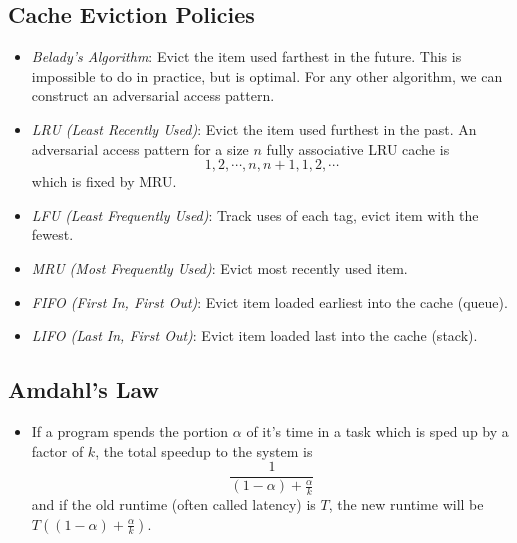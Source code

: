 \documentclass[12pt]{article}
\begin{document}
\subsection{Cache Eviction Policies}
\begin{itemize}
	\item \textit{Belady's Algorithm}: Evict the item used farthest in the future. This is impossible to do in practice, but is optimal. For any other algorithm, we can construct an adversarial access pattern. 
	\item \textit{LRU (Least Recently Used)}: Evict the item used furthest in the past. An adversarial access pattern for a size $n$ fully associative LRU cache is
		\begin{equation*}
			1,2,\cdots,n,n+1,1,2,\cdots
		\end{equation*}
		which is fixed by MRU.
	\item \textit{LFU (Least Frequently Used)}: Track uses of each tag, evict item with the fewest. 
	\item \textit{MRU (Most Frequently Used)}: Evict most recently used item. 
	\item \textit{FIFO (First In, First Out)}: Evict item loaded earliest into the cache (queue).
	\item \textit{LIFO (Last In, First Out)}: Evict item loaded last into the cache (stack). 
\end{itemize}
\subsection{Amdahl's Law}
\begin{itemize}
	\item If a program spends the portion $\alpha$ of it's time in a task which is sped up by a factor of $k$, the total speedup to the system is
		\begin{equation*}
			\frac{1}{(1-\alpha) + \frac{\alpha}{k}}
		\end{equation*}
		and if the old runtime (often called latency) is $T$, the new runtime will be $T((1-\alpha) + \frac{\alpha}{k})$.
\end{itemize}
\end{document}
